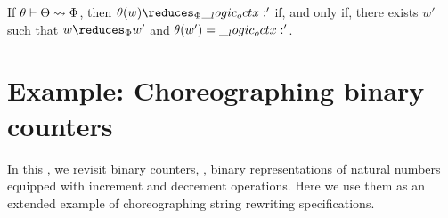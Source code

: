
\begin{corollary}\label{cor:formula-as-process:choreography-adequacy}
  If $\theta \vdash \Theta \rightsquigarrow \Phi$, then $\theta(w) \reduces_{\orsig} \octx'$ if, and only if, there exists $w'$ such that $w \reduces_{\orsig} w'$ and $\theta(w') = \__logic_octx:'$.
\end{corollary}

\section{Example: Choreographing binary counters}\label{sec:formula-as-process:counters}

In this , we revisit binary counters, \ie, binary representations of natural numbers equipped with increment and decrement operations.
Here we use them as an extended example of choreographing string rewriting specifications.

